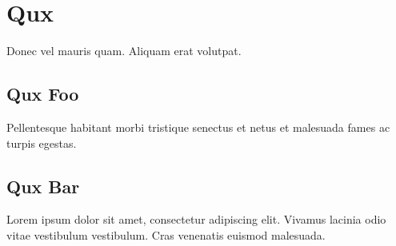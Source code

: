 \chapter{Qux}\label{qux}

Donec vel mauris quam. Aliquam erat volutpat.

\section{Qux Foo}\label{qux-foo}

Pellentesque habitant morbi tristique senectus et netus et malesuada fames ac turpis egestas.

\section{Qux Bar}\label{qux-bar}

Lorem ipsum dolor sit amet, consectetur adipiscing elit. Vivamus lacinia odio vitae vestibulum vestibulum. Cras venenatis euismod malesuada.
